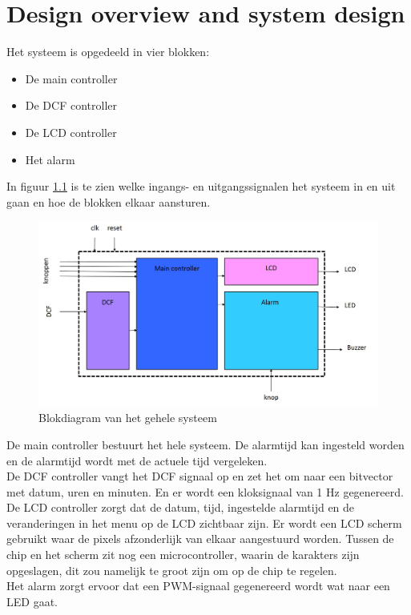 
\chapter{Design overview and system design}
Het systeem is opgedeeld in vier blokken:
\begin{itemize}
\item De main controller
\item De DCF controller
\item De LCD controller
\item Het alarm
\end{itemize}

\noindent In figuur \ref{fig:blokdiagram} is te zien welke ingangs- en uitgangssignalen het systeem in en uit gaan en hoe de blokken elkaar aansturen.

\begin{figure}[h!]
\center
\includegraphics[width=13cm]{figure/blokdiagram}
\caption{Blokdiagram van het gehele systeem}
\label{fig:blokdiagram}
\end{figure}

\noindent De main controller bestuurt het hele systeem. De alarmtijd kan ingesteld worden en de alarmtijd wordt met de actuele tijd vergeleken.\\
De DCF controller vangt het DCF signaal op en zet het om naar een bitvector met datum, uren en minuten. En er wordt een kloksignaal van 1 Hz gegenereerd.\\
De LCD controller zorgt dat de datum, tijd, ingestelde alarmtijd en de veranderingen in het menu op de LCD zichtbaar zijn. Er wordt een LCD scherm gebruikt waar de pixels afzonderlijk van elkaar aangestuurd worden. Tussen de chip en het scherm zit nog een microcontroller, waarin de karakters zijn opgeslagen, dit zou namelijk te groot zijn om op de chip te regelen.\\
Het alarm zorgt ervoor dat een PWM-signaal gegenereerd wordt wat naar een LED gaat.